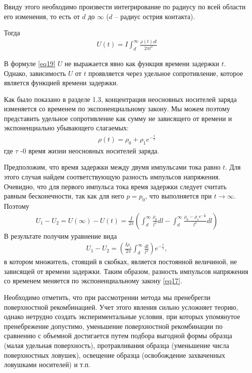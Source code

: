 Ввиду этого необходимо произвести интегрирование по радиусу по всей области его изменения, то есть от $d$ до $\infty$ ($d$ -- радиус острия контакта). 

Тогда
\begin{gather}
	\label{eq19}
	U(t)=I \int_{d}^{\infty} \frac{\rho(t) \dd l}{2 \pi l^{2}}
\end{gather}

В формуле \eqref{eq19} $U$ не выражается явно как функция времени задержки $t$. Однако, зависимость $U$ от $t$ проявляется через удельное сопротивление, которое является функцией времени задержки.

Как было показано в разделе 1.3, концентрация неосновных носителей заряда изменяется со временем по экспоненциальному закону. Мы можем поэтому представить удельное сопротивление как сумму не зависящего от времени и экспоненциально убывающего слагаемых: 
\begin{gather}
	\label{eq20}
	\rho(t)=\rho_{0}+\rho_{1} e^{-\frac{t}{\tau}}
\end{gather}
где $\tau$ -0 время жизни неосновных носителей заряда.

Предположим, что время задержки между двумя импульсами тока равно $t$. Для этого случая найдем соответствующую разность импульсов напряжения. Очевидно, что для первого импульса тока время задержки следует считать равным бесконечности, так как для него $p = p_0$, что выполняется при $t\to\infty$. Поэтому
\begin{gather}
	\label{eq21}
	U_{1}-U_{2}=U(\infty)-U(t)=\frac{I}{2 \pi}\left(\int_{d}^{\infty} \frac{\rho_{0}}{l^{2}} d l-\int_{d}^{\infty} \frac{\rho_{0}-\rho_{1} e^{-\frac{t}{\tau}}}{l^{2}} d l\right)
\end{gather}
В результате получим уравнение вида
\begin{gather}
 	\label{eq22}
 	U_{1}-U_{2}=\left(\frac{I \rho_{1}}{2 \pi} \int_{d}^{\infty} \frac{d l}{l^{2}}\right) e^{-\frac{t}{\tau}},
 \end{gather}
 в котором множитель, стоящий в скобках, является постоянной величиной, не зависящей от времени задержки. Таким образом, разность импульсов напряжения со временем меняется по экспоненциальному закону \eqref{eq17}.

Необходимо отметить, что при рассмотрении метода мы пренебрегли поверхностной рекомбинацией. Учет этого явления сильно усложняет теорию, однако нетрудно создать экспериментальные условия, при которых упомянутое пренебрежение допустимо, уменьшение поверхностной рекомбинации по сравнению с объемной достигается путем подбора выгодной формы образца (малая удельная поверхность), протравливания образца (уменьшение числа поверхностных ловушек), освещение образца (освобождение захваченных ловушками носителей) и т.п.

